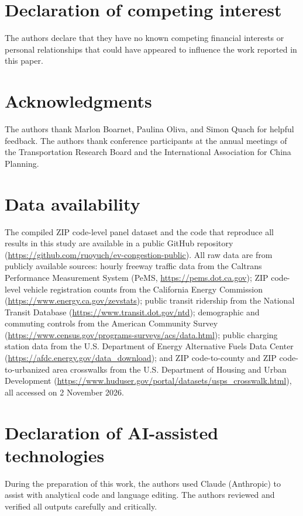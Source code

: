 \documentclass[11pt, letterpaper]{article}
\begin{document}
\section*{Declaration of competing interest}
\noindent
The authors declare that they have no known competing financial interests or personal relationships that could have appeared to influence the work reported in this paper.

\section*{Acknowledgments}
\noindent
The authors thank Marlon Boarnet, Paulina Oliva, and Simon Quach for helpful feedback.
The authors thank conference participants at the annual meetings of the Transportation Research Board and the International Association for China Planning.

\section*{Data availability}
\noindent
The compiled ZIP code-level panel dataset and the code that reproduce all results in this study are available in a public GitHub repository (\url{https://github.com/ruoyuch/ev-congestion-public}).
All raw data are from publicly available sources: hourly freeway traffic data from the Caltrans Performance Measurement System (PeMS, \url{https://pems.dot.ca.gov}); ZIP code-level vehicle registration counts from the California Energy Commission (\url{https://www.energy.ca.gov/zevstats}); public transit ridership from the National Transit Database (\url{https://www.transit.dot.gov/ntd}); demographic and commuting controls from the American Community Survey (\url{https://www.census.gov/programs-surveys/acs/data.html}); public charging station data from the U.S. Department of Energy Alternative Fuels Data Center (\url{https://afdc.energy.gov/data_download}); and ZIP code-to-county and ZIP code-to-urbanized area crosswalks from the U.S. Department of Housing and Urban Development (\url{https://www.huduser.gov/portal/datasets/usps_crosswalk.html}), all accessed on 2 November 2026.


\section*{Declaration of AI-assisted technologies}
\noindent
During the preparation of this work, the authors used Claude (Anthropic) to assist with analytical code and language editing.
The authors reviewed and verified all outputs carefully and critically.
\end{document}
